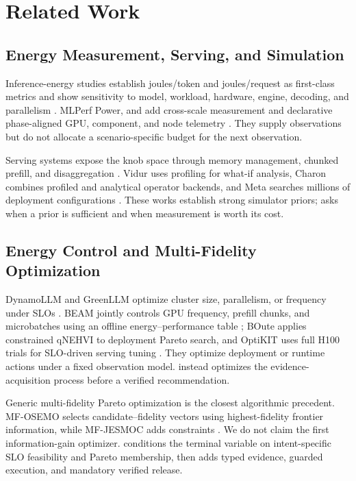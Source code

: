 \section{Related Work}

\subsection{Energy Measurement, Serving, and Simulation}

Inference-energy studies establish joules/token and joules/request as
first-class metrics and show sensitivity to model, workload, hardware, engine,
decoding, and parallelism
\cite{samsi2023words,fernandez2025energy,niu2025engines}.  MLPerf Power,
and \bench{} add cross-scale measurement and declarative phase-aligned GPU,
component, and node telemetry \cite{tschand2024mlperf,niu2026tokenpowerbench}.
They supply observations but do not allocate a scenario-specific budget for
the next observation.

Serving systems expose the knob space through memory management, chunked
prefill, and disaggregation \cite{kwon2023vllm,agrawal2024sarathi,
zhong2024distserve}.  Vidur uses profiling for what-if analysis, Charon combines
profiled and analytical operator backends, and Meta searches millions of
deployment configurations \cite{agrawal2024vidur,yang2026charon,
cho2026deployment}.  These works establish strong simulator priors;
\system{} asks when a prior is sufficient and when measurement is worth its
cost.

\subsection{Energy Control and Multi-Fidelity Optimization}

DynamoLLM and GreenLLM optimize cluster size, parallelism, or frequency under
SLOs \cite{stojkovic2024dynamollm,liu2025greenllm}.  BEAM jointly controls GPU
frequency, prefill chunks, and microbatches using an offline energy--performance
table \cite{lee2026beam}; BOute applies constrained qNEHVI to deployment Pareto
search, and OptiKIT uses full H100 trials for SLO-driven serving tuning
\cite{jiang2026boute,santavas2026optikit}.  They optimize deployment or runtime
actions under a fixed observation model.  \system{} instead optimizes the
evidence-acquisition process before a verified recommendation.

Generic multi-fidelity Pareto optimization is the closest algorithmic
precedent.  MF-OSEMO selects candidate--fidelity vectors using highest-fidelity
frontier information, while MF-JESMOC adds constraints
\cite{belakaria2020mfosemo,fernandezsanchez2025mfjesmoc}.  We do not claim the
first information-gain optimizer.  \ipig{} conditions the terminal variable on
intent-specific SLO feasibility and Pareto membership, then adds typed evidence,
guarded execution, and mandatory verified release.

